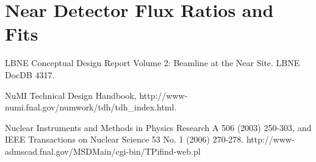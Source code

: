 \section{Near Detector Flux Ratios and Fits}
\label{app:far_plots}

\begin{thebibliography}{1}

LBNE Conceptual Design Report Volume 2: Beamline at the Near Site.  LBNE DocDB 4317.

NuMI Technical Design Handbook, http://www-numi.fnal.gov/numwork/tdh/tdh\_index.html.
  
 Nuclear Instruments and Methods in Physics Research A 506 (2003) 250-303, and IEEE Transactions on Nuclear Science 53 No. 1 (2006) 270-278. http://www-admscad.fnal.gov/MSDMain/cgi-bin/TPifind-web.pl 

\end{thebibliography}




























